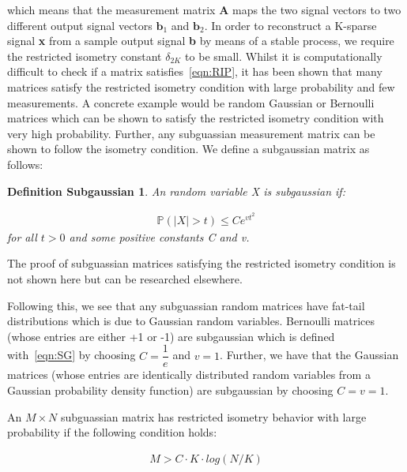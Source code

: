 \documentclass[titlepage,oneside, 12pt]{book}
\theoremstyle{break}
\begin{document}
which means that the measurement matrix \textbf{A} maps the two signal vectors to two different output signal vectors $\textbf{b}_{1}$ and  $\textbf{b}_{2}$.
In order to reconstruct a K-sparse signal \textbf{x} from a sample output signal \textbf{b} by means of a stable process, we require the restricted isometry constant $\delta_{2K}$ to be small. Whilst it is computationally difficult to check if a matrix satisfies~\ref{eqn:RIP}, it has been shown that many matrices satisfy the restricted isometry condition with large probability and few measurements. A concrete example would be random Gaussian or Bernoulli matrices which can be shown to satisfy the restricted isometry condition with very high probability. Further, any subguassian measurement matrix can be shown to follow the isometry condition. We define a subgaussian matrix as follows:

\newtheorem*{SG}{Definition Subgaussian}
\begin{SG}
An random variable X is subgaussian if:

\begin{equation}
\begin{gathered}
\mathbb{P}(|X| > t) \leq Ce^{vt^{2}}
\end{gathered}
\label{eqn:SG}
\end{equation}
for all $t > 0$ and some positive constants C and v.  
\end{SG}

The proof of subguassian matrices satisfying the restricted isometry condition is not shown here but can be researched elsewhere. \cite{CST&A}

Following this, we see that any subguassian random matrices have fat-tail distributions which is due to Gaussian random variables. Bernoulli matrices (whose entries are either +1 or -1) are subgaussian which is defined with~\ref{eqn:SG} by choosing $C = \dfrac{1}{e}$ and $v = 1$. Further, we have that the Gaussian matrices (whose entries are identically distributed random variables from a Gaussian probability density function) are subgaussian by choosing $C = v = 1$.

An $M \times N$ subguassian matrix has restricted isometry behavior with large probability if the following condition holds:


\begin{equation}
\begin{gathered}
M > C \cdot K \cdot log(N/K)
\end{gathered}
\label{eqn:fact3}
\end{equation}
\end{document}
